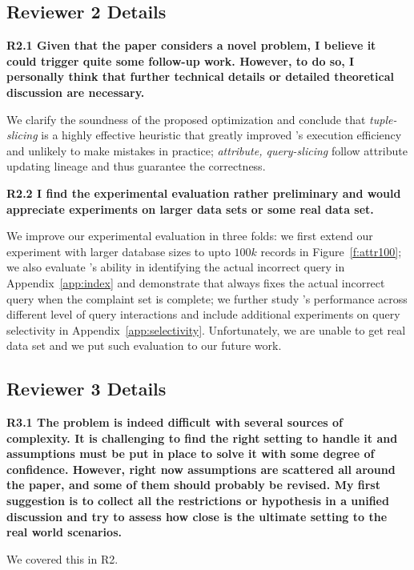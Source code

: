 \subsection*{Reviewer 2 Details}

\noindent \textbf{R2.1 Given that the paper considers a novel problem, I believe it could trigger quite some follow-up work. However, to do so, I personally think that further technical details or detailed theoretical discussion are necessary. }

We clarify the soundness of the proposed optimization and conclude that \emph{tuple-slicing} is a highly effective heuristic that greatly improved \sys's execution efficiency and unlikely to make mistakes in practice; \emph{attribute, query-slicing} follow attribute updating lineage and thus guarantee the correctness.  

\noindent \textbf{R2.2 I find the experimental evaluation rather preliminary and would appreciate experiments on larger data sets or some real data set.}

We improve our experimental evaluation in three folds: we first extend our experiment with larger database sizes to upto $100k$ records in Figure~\ref{f:attr100}; we also evaluate
\sys's ability in identifying the actual incorrect query in Appendix~\ref{app:index} and demonstrate that \sys always fixes the actual incorrect query when the complaint set is complete; we further study \sys's performance across different level of query interactions and include additional experiments on query selectivity in Appendix~\ref{app:selectivity}. Unfortunately, we are unable to get real data set and we put such evaluation to our future work. 

\subsection*{Reviewer 3 Details}

\noindent \textbf{R3.1 The problem is indeed difficult with several sources of complexity. It is challenging to find the right setting to handle it and assumptions must be put in place to solve it with some degree of confidence. However, right now assumptions are scattered all around the paper, and some of them should probably be revised.
My first suggestion is to collect all the restrictions or hypothesis in a unified discussion and try to assess how close is the ultimate setting to the real world scenarios.} 

We covered this in R2. 

